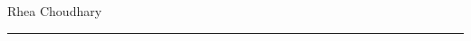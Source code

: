 \noindent
\begin{minipage}[t]{0.60\textwidth}
  {\large\bfseries \pstitle}
\end{minipage}\hfill
\begin{minipage}[t]{0.38\textwidth}
  \raggedleft
  Rhea Choudhary\\[2pt]
  \schoolheader
\end{minipage}

\vspace{0.5em}
\noindent\rule{\textwidth}{0.8pt}

\vspace{1.1em}
\psnoindent
